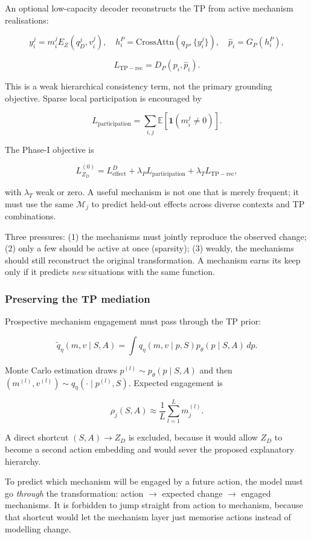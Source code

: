 \documentclass[11pt]{article}
\newenvironment{plainword}{%
  \par\medskip\noindent\begin{minipage}{\textwidth}%
  \color{gray!75!black}\small\itshape
}{%
  \end{minipage}\par\medskip}
\begin{document}
An optional low-capacity decoder reconstructs the TP from active mechanism realisations:

\[
y_i^j=m_i^jE_Z(q_D^j,v_i^j),\quad
h_i^P=\mathrm{CrossAttn}(q_P,\{y_i^j\}),\quad
\widehat p_i=G_P(h_i^P),
\]

\[
\boxed{L_{\mathrm{TP-rec}}=D_P(p_i,\widehat p_i).}
\]

This is a weak hierarchical consistency term, not the primary grounding objective. Sparse local participation is encouraged by

\[
\boxed{L_{\mathrm{participation}}=
\sum_{i,j}\mathbb E[\mathbf 1(m_i^j\neq0)].}
\]

The Phase-I objective is

\[
\boxed{
L_{Z_D}^{(0)}=L_{\mathrm{effect}}^D
+\lambda_P L_{\mathrm{participation}}
+\lambda_T L_{\mathrm{TP-rec}},}
\]

with $\lambda_T$ weak or zero. A useful mechanism is not one that is merely frequent; it must use the same $\mathcal M_j$ to predict
held-out effects across diverse contexts and TP combinations.

\begin{plainword}
Three pressures: (1) the mechanisms must jointly reproduce the observed change; (2) only a few should be active at once (sparsity);
(3) weakly, the mechanisms should still reconstruct the original transformation. A mechanism earns its keep only if it predicts
\emph{new} situations with the same function.
\end{plainword}

\subsubsection*{Preserving the TP mediation}

Prospective mechanism engagement must pass through the TP prior:

\[
\boxed{
\widetilde q_\eta(m,v\mid S,A)=
\int q_\eta(m,v\mid p,S)p_\theta(p\mid S,A)\,dp.}
\]

Monte Carlo estimation draws $p^{(l)}\sim p_\theta(p\mid S,A)$ and then $(m^{(l)},v^{(l)})\sim q_\eta(\cdot\mid p^{(l)},S)$.
Expected engagement is

\[
\boxed{\rho_j(S,A)\approx\frac1L\sum_{l=1}^Lm_j^{(l)}.}
\]

A direct shortcut $(S,A)\rightarrow Z_D$ is excluded, because it would allow $Z_D$ to become a second action embedding and would
sever the proposed explanatory hierarchy.

\begin{plainword}
To predict which mechanism will be engaged by a future action, the model must go \emph{through} the transformation: action $\to$
expected change $\to$ engaged mechanisms. It is forbidden to jump straight from action to mechanism, because that shortcut would let
the mechanism layer just memorise actions instead of modelling change.
\end{plainword}
\end{document}
